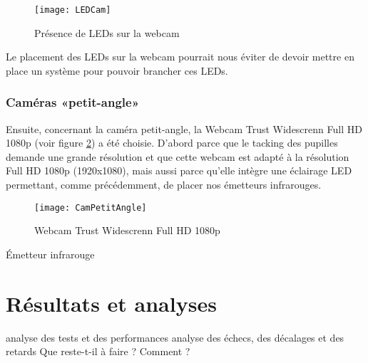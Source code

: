 \begin{figure}[H]
  \centering
  \texttt{[image: LEDCam]}
  \caption{Présence de LEDs sur la webcam}
  \label{fig:LEDCam}
\end{figure}

Le placement des LEDs sur la webcam pourrait nous éviter de devoir mettre en place un système pour pouvoir brancher ces LEDs.


\subsection{Caméras «petit-angle»}

Ensuite, concernant la caméra petit-angle, la Webcam Trust Widescrenn Full HD 1080p (voir figure \ref{fig:CamPetitAngle}) a été choisie. D'abord parce que le tacking des pupilles demande une grande résolution et que cette webcam est adapté à la résolution Full HD 1080p (1920x1080), mais aussi parce qu'elle intègre une éclairage LED permettant, comme précédemment, de placer nos émetteurs infrarouges.

\begin{figure}[H]
  \centering
  \texttt{[image: CamPetitAngle]}
  \caption{Webcam Trust Widescrenn Full HD 1080p}
  \label{fig:CamPetitAngle}
\end{figure}Émetteur infrarouge




\chapter{Résultats et analyses}

analyse des tests et des performances
analyse des échecs, des décalages et des retards
Que reste-t-il à faire ? Comment ?

